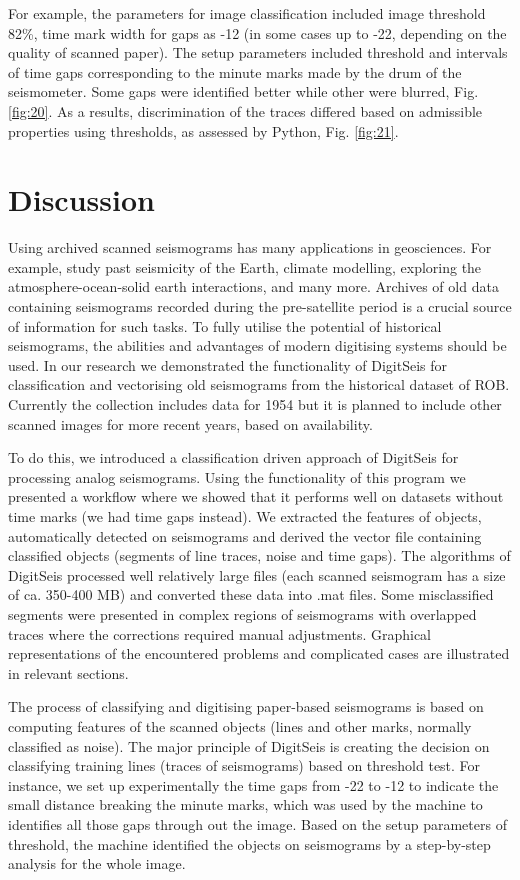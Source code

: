 \documentclass[informatics,article,submit,moreauthors,pdftex]{Definitions/mdpi}
\begin{document}
For example, the parameters for image classification included image threshold 82\%, time mark width for gaps as -12 (in some cases up to -22, depending on the quality of scanned paper). The setup parameters included threshold and intervals of time gaps corresponding to the minute marks made by the drum of the seismometer. Some gaps were identified better while other were blurred, Fig. \ref{fig:20}. As a results, discrimination of the traces differed based on admissible properties using thresholds, as assessed by Python, Fig. \ref{fig:21}. 

\section{Discussion}

Using archived scanned seismograms has many applications in geosciences. For example, study past seismicity of the Earth, climate modelling, exploring the atmosphere-ocean-solid earth interactions, and many more. Archives of old data containing seismograms recorded during the pre-satellite period is a crucial source of information for such tasks. To fully utilise the potential of historical seismograms, the abilities and advantages of modern digitising systems should be used. In our research we demonstrated the functionality of DigitSeis for classification and vectorising old seismograms from the historical dataset of \ac{ROB}. Currently the collection includes data for 1954 but it is planned to include other scanned images for more recent years, based on availability. 

To do this, we introduced a classification driven approach of DigitSeis for processing analog seismograms. Using the functionality of this program we presented a workflow where we showed that it performs well on datasets without time marks (we had time gaps instead). We extracted the features of objects, automatically detected on seismograms and derived the vector file containing classified objects (segments of line traces, noise and time gaps). The algorithms of DigitSeis processed well relatively large files (each scanned seismogram has a size of ca. 350-400 MB) and converted these data into .mat files. Some misclassified segments were presented in complex regions of seismograms with overlapped traces where the corrections required manual adjustments. Graphical representations of the encountered problems and complicated cases are illustrated in relevant sections. 

The process of classifying and digitising paper-based seismograms is based on computing features of the scanned objects (lines and other marks, normally classified as noise). The major principle of DigitSeis is creating the decision on classifying training lines (traces of seismograms) based on threshold test. For instance, we set up experimentally the time gaps from -22 to -12 to indicate the small distance breaking the minute marks, which was used by the machine to identifies all those gaps through out the image. Based on the setup parameters of threshold, the machine identified the objects on seismograms by a step-by-step analysis for the whole image.
\end{document}
